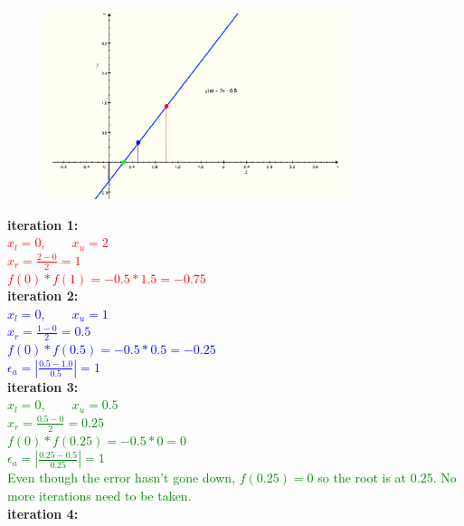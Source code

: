 \documentclass[11pt]{article}
\begin{document}
\begin{figure}[H]
	\centering
	\includegraphics[width=0.8\textwidth]{plot}
\end{figure}
\textbf{iteration 1:}\\
\textcolor{red}{
$x_l = 0,\qquad x_u = 2$ \\\vspace{2pt}
$x_r = \frac{2-0}{2} = 1$\\\vspace{2pt}
$f(0)*f(1) = -0.5*1.5 = -0.75$\\\vspace{2pt}
}
\textbf{iteration 2:}\\
\textcolor{blue}{
	$x_l = 0,\qquad x_u = 1$ \\\vspace{2pt}
	$x_r = \frac{1-0}{2} = 0.5$\\\vspace{2pt}
	$f(0)*f(0.5) = -0.5*0.5 = -0.25$\\\vspace{2pt}
	$\epsilon_a = |\frac{0.5-1.0}{0.5}| = 1$ \\\vspace{2pt}
}
\newpage
\textbf{iteration 3:}\\
\textcolor{green}{
	$x_l = 0,\qquad x_u = 0.5$ \\\vspace{2pt}
	$x_r = \frac{0.5-0}{2} = 0.25$\\\vspace{2pt}
	$f(0)*f(0.25) = -0.5*0 = 0$\\\vspace{2pt}
	$\epsilon_a = |\frac{0.25-0.5}{0.25}| = 1$ \\\vspace{4pt}
	Even though the error hasn't gone down, $f(0.25)=0$ so the root is at $0.25$. No more iterations need to be taken.\\\vspace{2pt}
}
\textbf{iteration 4:}\\
\end{document}
